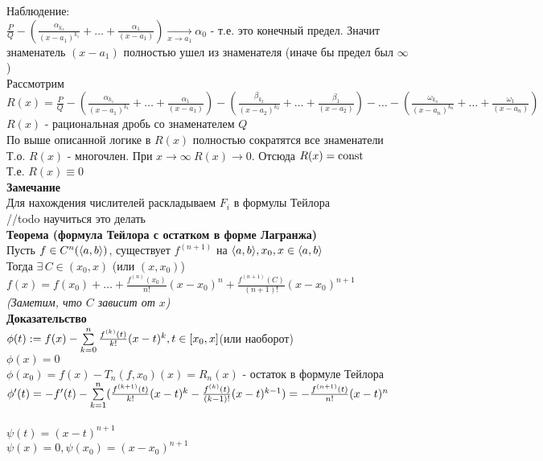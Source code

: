 \documentclass[12pt]{article}
\begin{document}
Наблюдение:\\
$\frac{P}{Q} - (\frac{\alpha_{k_1}}{(x-a_1)^{k_1}} + \ldots + \frac{\alpha_1}{(x-a_1)}) \xrightarrow[x\rightarrow a_1]{} \alpha_0$ - т.е. это конечный предел. Значит знаменатель $(x-a_1)$ полностью ушел из знаменателя (иначе бы предел был $\infty$)\\
Рассмотрим $R(x) = \frac{P}{Q} - (\frac{\alpha_{k_1}}{(x-a_1)^{k_1}} + \ldots + \frac{\alpha_1}{(x-a_1)}) - (\frac{\beta_{k_2}}{(x-a_2)^{k_2}} + \ldots + \frac{\beta_1}{(x-a_2)}) - \ldots - (\frac{\omega_{k_n}}{(x-a_n)^{k_n}} + \ldots + \frac{\omega_1}{(x-a_n)})$\\
$R(x)$ - рациональная дробь со знаменателем $Q$\\
По выше описанной логике в $R(x)$ полностью сократятся все знаменатели\\
Т.о. $R(x)$ - многочлен. При $x \rightarrow \infty\ R(x) \rightarrow 0$. Отсюда $R(x) = \operatorname{const}$\\
Т.е. $R(x) \equiv 0$\\
\textbf{Замечание}\\
Для нахождения числителей раскладываем $F_i$ в формулы Тейлора\\
//todo научиться это делать\\
\textbf{Теорема (формула Тейлора с остатком в форме Лагранжа)}\\
Пусть $f \in C^n(\langle a, b \rangle)$, существует $f^{(n+1)}$ на $\langle a, b \rangle, x_0, x \in \langle a, b \rangle$\\
Тогда $\exists\,C \in (x_0, x)$ (или $(x, x_0)$)\\
$f(x) = f(x_0) + \ldots + \frac{f^{(n)}(x_0)}{n!}(x-x_0)^n + \frac{f^{(n+1)}(C)}{(n+1)!}(x-x_0)^{n+1}$\\
\textit{(Заметим, что $C$ зависит от $x$)}\\
\textbf{Доказательство}\\
$\phi(t) := f(x) - \sum\limits_{k=0}^n \frac{f^{(k)}(t)}{k!}(x-t)^k, t \in [x_0, x]$(или наоборот)\\
$\phi(x) = 0$\\
$\phi(x_0) = f(x) - T_n(f, x_0)(x) = R_n(x)$ - остаток в формуле Тейлора\\
$\phi'(t) = -f'(t)-\sum\limits_{k=1}^n(\frac{f^{(k+1)}(t)}{k!}(x-t)^k - \frac{f^{(k)}(t)}{(k-1)!}(x-t)^{k-1}) = -\frac{f^{(n+1)}(t)}{n!}(x-t)^n$\\\\
$\psi(t) = (x-t)^{n+1}$\\
$\psi(x) = 0, \psi(x_0) = (x-x_0)^{n+1}$\\
\end{document}
